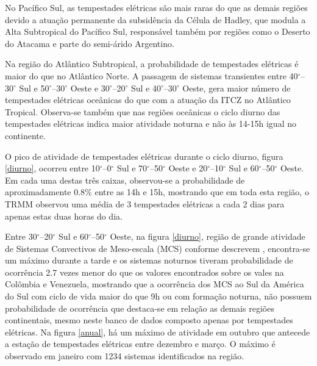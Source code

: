 No Pacífico Sul, as tempestades elétricas são mais raras do que as demais regiões devido a atuação permanente da subsidência da Célula de Hadley, que modula a Alta Subtropical do Pacífico Sul, responsável também por regiões como o Deserto do Atacama e parte do semi-árido Argentino.

Na região do Atlântico Subtropical, a probabilidade de tempestades elétricas é maior do que no Atlântico Norte. A passagem de sistemas transientes entre 40$^{\circ}$--30$^{\circ}$ Sul e 50$^{\circ}$--30$^{\circ}$ Oeste e 30$^{\circ}$--20$^{\circ}$ Sul e 40$^{\circ}$--30$^{\circ}$ Oeste, gera maior número de tempestades elétricas oceânicas do que com a atuação da ITCZ no Atlântico Tropical. Observa-se também que nas regiões oceânicas o ciclo diurno das tempestades elétricas indica maior atividade noturna e não às 14-15h igual no continente.


O pico de atividade de tempestades elétricas durante o ciclo diurno, figura \ref{diurno}, ocorreu entre 10$^{\circ}$--0$^{\circ}$ Sul e 70$^{\circ}$--50$^{\circ}$ Oeste e 20$^{\circ}$--10$^{\circ}$ Sul e 60$^{\circ}$--50$^{\circ}$ Oeste. Em cada uma destas três caixas, observou-se a probabilidade de aproximadamente 0.8\% entre as 14h e 15h, mostrando que em toda esta região, o TRMM observou uma média de 3 tempestades elétricas a cada 2 dias para apenas estas duas horas do dia.


Entre 30$^{\circ}$--20$^{\circ}$ Sul e 60$^{\circ}$--50$^{\circ}$ Oeste, na figura \ref{diurno}, região de grande atividade de Sistemas Convectivos de Meso-escala (MCS) conforme descrevem , encontra-se um máximo durante a tarde e os sistemas noturnos tiveram probabilidade de ocorrência 2.7 vezes menor do que os valores encontrados sobre os vales na Colômbia e Venezuela, mostrando que a ocorrência dos MCS ao Sul da América do Sul com ciclo de vida maior do que 9h ou com formação noturna, não possuem probabilidade de ocorrência que destaca-se em relação as demais regiões continentais, mesmo neste banco de dados composto apenas por tempestades elétricas. Na figura \ref{anual}, há um máximo de atividade em outubro que antecede a estação de tempestades elétricas entre dezembro e março. O máximo é observado em janeiro com 1234 sistemas identificados na região.



